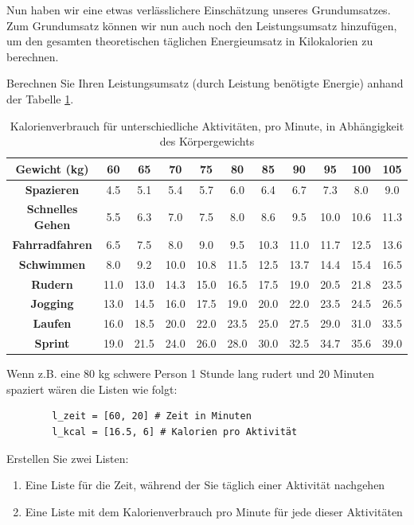 Nun haben wir eine etwas verlässlichere Einschätzung unseres Grundumsatzes. Zum Grundumsatz können wir nun auch noch den Leistungsumsatz hinzufügen, um den gesamten theoretischen täglichen Energieumsatz in Kilokalorien zu berechnen.

\begin{myexercise}\label{ex:leistungsumsatz}
	Berechnen Sie Ihren Leistungsumsatz (durch Leistung benötigte Energie) anhand der Tabelle \ref{tab:kcal}.

	\begin{table}[H]
		\centering
		\begin{tabular}{c|*{10}{c}}
			\textbf{Gewicht (kg)}    & 60   & 65   & 70   & 75   & 80   & 85   & 90   & 95   & 100  & 105  \\
			\midrule\midrule
			\textbf{Spazieren}       & 4.5  & 5.1  & 5.4  & 5.7  & 6.0  & 6.4  & 6.7  & 7.3  & 8.0  & 9.0  \\
			\midrule
			\textbf{Schnelles Gehen} & 5.5  & 6.3  & 7.0  & 7.5  & 8.0  & 8.6  & 9.5  & 10.0 & 10.6 & 11.3 \\
			\midrule
			\textbf{Fahrradfahren}   & 6.5  & 7.5  & 8.0  & 9.0  & 9.5  & 10.3 & 11.0 & 11.7 & 12.5 & 13.6 \\
			\midrule
			\textbf{Schwimmen}       & 8.0  & 9.2  & 10.0 & 10.8 & 11.5 & 12.5 & 13.7 & 14.4 & 15.4 & 16.5 \\
			\midrule
			\textbf{Rudern}          & 11.0 & 13.0 & 14.3 & 15.0 & 16.5 & 17.5 & 19.0 & 20.5 & 21.8 & 23.5 \\
			\midrule
			\textbf{Jogging}         & 13.0 & 14.5 & 16.0 & 17.5 & 19.0 & 20.0 & 22.0 & 23.5 & 24.5 & 26.5 \\
			\midrule
			\textbf{Laufen}          & 16.0 & 18.5 & 20.0 & 22.0 & 23.5 & 25.0 & 27.5 & 29.0 & 31.0 & 33.5 \\
			\midrule
			\textbf{Sprint}          & 19.0 & 21.5 & 24.0 & 26.0 & 28.0 & 30.0 & 32.5 & 34.7 & 35.6 & 39.0 \\
		\end{tabular}
		\caption{Kalorienverbrauch für unterschiedliche Aktivitäten, pro Minute, in Abhängigkeit des Körpergewichts}
		\label{tab:kcal}
	\end{table}
	Wenn z.B. eine 80 kg schwere Person 1 Stunde lang rudert und 20 Minuten spaziert wären die Listen wie folgt:
	\begin{lstlisting}
		l_zeit = [60, 20] # Zeit in Minuten
		l_kcal = [16.5, 6] # Kalorien pro Aktivität
	\end{lstlisting}
	Erstellen Sie zwei Listen:
	\begin{enumerate}
		\item Eine Liste für die Zeit, während der Sie täglich einer Aktivität nachgehen
		\item Eine Liste mit dem Kalorienverbrauch pro Minute für jede dieser Aktivitäten
	\end{enumerate}


\end{myexercise}
